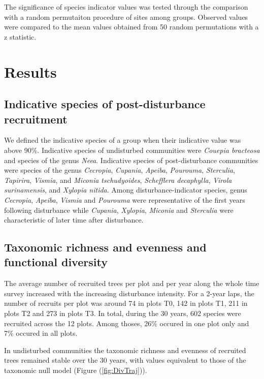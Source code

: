 \documentclass[fleqn,10pt]{ArtEcoFoG} %
\begin{document}
The significance of species indicator values was tested through the
comparison with a random permutaiton procedure of sites among groups.
Observed values were compared to the mean values obtained from 50 random
permutations with a z statistic.

\section{Results}\label{results}

\subsection{Indicative species of post-disturbance
recruitment}\label{indicative-species-of-post-disturbance-recruitment}

We defined the indicative species of a group when their indicative value
was above 90\%. Indicative species of undisturbed communities were
\emph{Couepia bracteosa} and species of the genus \emph{Neea}.
Indicative species of post-disturbance communities were species of the
genus \emph{Cecropia}, \emph{Cupania}, \emph{Apeiba}, \emph{Pourouma},
\emph{Sterculia}, \emph{Tapirira}, \emph{Vismia}, and \emph{Miconia
tschudyoides}, \emph{Schefflera decaphylla}, \emph{Virola surinamensis},
and \emph{Xylopia nitida}. Among disturbance-indicator species, genus
\emph{Cecropia}, \emph{Apeiba}, \emph{Vismia} and \emph{Pourouma} were
representative of the first years following disturbance while
\emph{Cupania}, \emph{Xylopia}, \emph{Miconia} and \emph{Sterculia} were
characteristic of later time after disturbance.

\subsection{Taxonomic richness and evenness and functional
diversity}\label{taxonomic-richness-and-evenness-and-functional-diversity}

The average number of recruited trees per plot and per year along the
whole time survey increased with the increasing disturbance intensity.
For a 2-year laps, the number of recruits per plot was around 74 in
plots T0, 142 in plots T1, 211 in plots T2 and 273 in plots T3. In
total, during the 30 years, 602 species were recruited across the 12
plots. Among thoses, 26\% occured in one plot only and 7\% occured in
all plots.

In undisturbed communities the taxonomic richness and evenness of
recruited trees remained stable over the 30 years, with values
equivalent to those of the taxonomic null model (Figure
(\ref{fig:DivTraj})).
\end{document}
